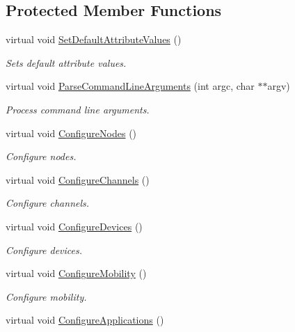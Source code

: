 \subsection*{Protected Member Functions}
\begin{DoxyCompactItemize}
\item 
virtual void \hyperlink{classVanetRoutingExperiment_ad25e34fd1c4a70fdb64ca910a81f1086}{Set\+Default\+Attribute\+Values} ()
\begin{DoxyCompactList}\small\item\em Sets default attribute values. \end{DoxyCompactList}\item 
virtual void \hyperlink{classVanetRoutingExperiment_a1a1c9edf653b9236fe159bc310e29634}{Parse\+Command\+Line\+Arguments} (int argc, char $\ast$$\ast$argv)
\begin{DoxyCompactList}\small\item\em Process command line arguments. \end{DoxyCompactList}\item 
virtual void \hyperlink{classVanetRoutingExperiment_a8aca14468bc2b8bd81d014ddd26d12b2}{Configure\+Nodes} ()
\begin{DoxyCompactList}\small\item\em Configure nodes. \end{DoxyCompactList}\item 
virtual void \hyperlink{classVanetRoutingExperiment_adcb4d2d4146919dc6f2cbdc183068e6a}{Configure\+Channels} ()
\begin{DoxyCompactList}\small\item\em Configure channels. \end{DoxyCompactList}\item 
virtual void \hyperlink{classVanetRoutingExperiment_a8a87095bf48ff559d8d4e82215ea996c}{Configure\+Devices} ()
\begin{DoxyCompactList}\small\item\em Configure devices. \end{DoxyCompactList}\item 
virtual void \hyperlink{classVanetRoutingExperiment_a394091f55f6b83df2a1afdff23d1f3da}{Configure\+Mobility} ()
\begin{DoxyCompactList}\small\item\em Configure mobility. \end{DoxyCompactList}\item 
virtual void \hyperlink{classVanetRoutingExperiment_ac9ec4394e60b165e355ddbe1eecc78fd}{Configure\+Applications} ()
$$
\end{DoxyCompactItemize}
